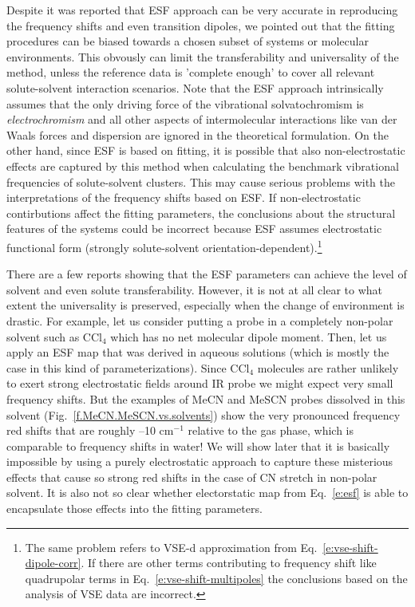 \documentclass[a4paper,titlepage,twoside,fleqn,12pt]{book}
\begin{document}
\begin{refsection}
Despite it was reported that ESF approach can be very accurate in reproducing the frequency shifts and even
transition dipoles, we pointed out that the fitting procedures
can be biased towards a chosen subset of systems or molecular environments. This obvously can limit
the transferability and universality of the method, unless the reference data is 'complete enough'
to cover all relevant solute\hyp{}solvent interaction scenarios. Note that the ESF approach intrinsically
assumes that the only driving force of the vibrational solvatochromism is \emph{electrochromism}
and all other aspects of intermolecular interactions like van der Waals forces and dispersion are
ignored in the theoretical formulation. On the other hand, since ESF is based on fitting, it is 
possible that also non\hyp{}electrostatic effects are captured by this method when calculating the benchmark 
vibrational frequencies of solute\hyp{}solvent clusters. This may cause serious problems with the interpretations
of the frequency shifts based on ESF. If non\hyp{}electrostatic contirbutions affect the fitting
parameters, the conclusions about the structural features of the systems could be incorrect 
because ESF assumes electrostatic functional form (strongly solute\hyp{}solvent orientation\hyp{}dependent).\footnote{
The same problem refers to VSE-d approximation from Eq.~\eqref{e:vse-shift-dipole-corr}.
If there are other terms contributing to frequency shift like quadrupolar terms 
in Eq.~\eqref{e:vse-shift-multipoles} the conclusions based
on the analysis of VSE data are incorrect.}

There are a few reports showing that the ESF parameters can achieve the level of solvent
and even solute transferability.\citep{Kwac.Lee.Cho.JCP.2004,
DeCamp.DeFlores.McCracken.Tokmakoff.Kwac.Cho.JPCB.2005,Jansen.Knoester.JCP.2006,
Choi.Raleigh.Cho.JPCL.2011} However, it is not at all clear to what extent the universality is
preserved, especially when the change of environment is drastic. For example, let us consider putting a probe in
a completely non\hyp{}polar solvent such as CCl$_4$ which has no net molecular dipole moment. 
Then, let us apply an ESF map that was derived in aqueous solutions (which is mostly the case in this kind
of parameterizations). Since CCl$_4$ molecules are rather unlikely to exert strong electrostatic fields 
around IR probe we might expect very small frequency shifts. But the examples of MeCN and MeSCN probes
dissolved in this solvent (Fig.~\ref{f.MeCN.MeSCN.vs.solvents}) show the very pronounced frequency red shifts that are roughly --10 cm$^{-1}$
relative to the gas phase, which is comparable to frequency shifts in water! 
We will show later that it is basically impossible by using a purely electrostatic approach
to capture these misterious effects that cause so strong red shifts in the case of CN stretch in non\hyp{}polar
solvent. It is also not so clear whether electorstatic map from Eq.~\eqref{e:esf} is able to 
encapsulate those effects into the fitting parameters.


\end{refsection}
\end{document}
